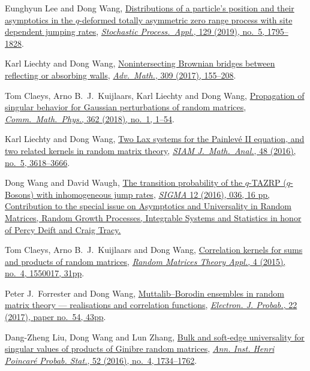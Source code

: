 \begin{etaremune}
\item
  Eunghyun Lee and Dong Wang, \href{https://arxiv.org/abs/1703.08839}{Distributions of a particle's position and their asymptotics in the $q$-deformed totally asymmetric zero range process with site dependent jumping rates}, \href{https://doi.org/10.1016/j.spa.2018.06.005}{\textit{Stochastic Process.\ Appl.}, 129 (2019), no.\ 5, 1795--1828}.
\item
  Karl Liechty and Dong Wang, \href{http://arxiv.org/abs/1608.08712}{Nonintersecting Brownian bridges between reflecting or absorbing walls}, \href{https://doi.org/10.1016/j.aim.2016.10.024}{\textit{Adv.\ Math.}, 309 (2017), 155--208}.
\item
  Tom Claeys, Arno B.~J.~Kuijlaars, Karl Liechty and Dong Wang, \href{http://arxiv.org/abs/1608.05870}{Propagation of singular behavior for Gaussian perturbations of random matrices}, \href{https://doi.org/10.1007/s00220-018-3195-8}{\textit{Comm.\ Math.\ Phys.}, 362 (2018), no.\ 1, 1--54}.
\item
  Karl Liechty and Dong Wang, \href{http://arxiv.org/abs/1601.01603}{Two Lax systems for the Painlev\'{e} II equation, and two related kernels in random matrix theory}, \href{https://doi.org/10.1137/16M1056080}{\textit{SIAM J.\ Math.\ Anal.}, 48 (2016), no.\ 5, 3618--3666}.
\item
  Dong Wang and David Waugh, \href{http://arxiv.org/abs/1512.01612}{The transition probability of the $q$-TAZRP ($q$-Bosons) with inhomogeneous jump rates}, \href{https://doi.org/10.3842/SIGMA.2016.037}{\textit{SIGMA} 12 (2016), 036, 16 pp, Contribution to the special issue on Asymptotics and Universality in Random Matrices, Random Growth Processes, Integrable Systems and Statistics in honor of Percy Deift and Craig Tracy.}
\item 
  Tom Claeys, Arno B.~J.~Kuijlaars and Dong Wang, \href{http://arxiv.org/abs/1505.00610}{Correlation kernels for sums and products of random matrices}, \href{https://doi.org/10.1142/S2010326315500173}{\textit{Random Matrices Theory Appl.}, 4 (2015), no.\ 4, 1550017, 31pp}.
\item
  Peter J.~Forrester and Dong Wang, \href{http://arxiv.org/abs/1502.07147}{Muttalib--Borodin ensembles in random matrix theory --- realisations and correlation functions}, \href{https://doi.org/10.1214/17-EJP62}{\textit{Electron. J. Probab.}, 22 (2017), paper no.\ 54, 43pp}.
\item
  Dang-Zheng Liu, Dong Wang and Lun Zhang, \href{http://arxiv.org/abs/1412.6777}{Bulk and soft-edge universality for singular values of products of Ginibre random matrices}, \href{https://doi.org/10.1214/15-AIHP696}{\textit{Ann. Inst. Henri Poincar\'e Probab. Stat.}, 52 (2016), no.\ 4, 1734--1762}.

\end{etaremune}

